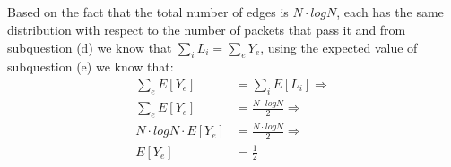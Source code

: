 \documentclass[11pt]{537homework}
\begin{document}
\subsection{}
 Based on the fact that the total number of edges is $N\cdot logN$, each has the same distribution with respect to the number of packets that pass it and from subquestion (d) we know that $\sum_{i}^{} L_i = \sum_{e}^{} Y_{e}$, using the expected value of subquestion (e) we know that:
 \begin{align*}
\sum_{e}^{} E[Y_e] &= \sum_{i}^{} E[L_i] \Longrightarrow \\
\sum_{e}^{} E[Y_e] &= \frac{N \cdot logN}{2} \Longrightarrow \\
N\cdot logN \cdot E[Y_e] &= \frac{N \cdot logN}{2} \Longrightarrow \\
E[Y_e] &= \frac{1}{2} 
\end{align*}
\end{document}
